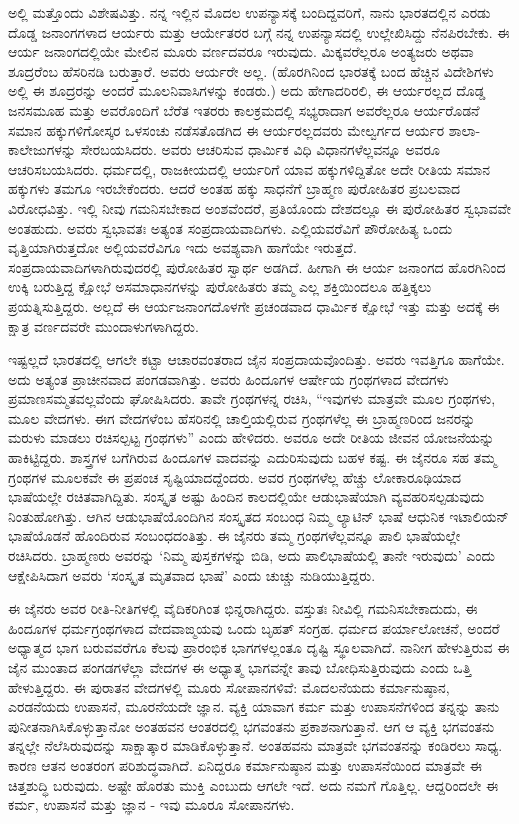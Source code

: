 ಅಲ್ಲಿ ಮತ್ತೊಂದು ವಿಶೇಷವಿತ್ತು. ನನ್ನ ಇಲ್ಲಿನ ಮೊದಲ ಉಪನ್ಯಾಸಕ್ಕೆ ಬಂದಿದ್ದವರಿಗೆ, ನಾನು ಭಾರತದಲ್ಲಿನ ಎರಡು ದೊಡ್ಡ ಜನಾಂಗಗಳಾದ ಆರ್ಯರು ಮತ್ತು ಆರ್ಯೇತರರ ಬಗ್ಗೆ ನನ್ನ ಉಪನ್ಯಾಸದಲ್ಲಿ ಉಲ್ಲೇಖಿಸಿದ್ದು ನೆನಪಿರಬೇಕು. ಈ ಆರ್ಯ ಜನಾಂಗದಲ್ಲಿಯೇ ಮೇಲಿನ ಮೂರು ವರ್ಣದವರೂ ಇರುವುದು. ಮಿಕ್ಕವರೆಲ್ಲರೂ ಅಂತ್ಯಜರು ಅಥವಾ ಶೂದ್ರರೆಂಬ ಹೆಸರಿನಡಿ ಬರುತ್ತಾರೆ. ಅವರು ಆರ್ಯರೇ ಅಲ್ಲ. (ಹೊರಗಿನಿಂದ ಭಾರತಕ್ಕೆ ಬಂದ ಹೆಚ್ಚಿನ ವಿದೇಶಿಗಳು ಅಲ್ಲಿ ಈ ಶೂದ್ರರನ್ನು ಅಂದರೆ ಮೂಲನಿವಾಸಿಗಳನ್ನು ಕಂಡರು.) ಅದು ಹೇಗಾದರಿರಲಿ, ಈ ಆರ್ಯರಲ್ಲದ ದೊಡ್ಡ ಜನಸಮೂಹ ಮತ್ತು ಅವರೊಂದಿಗೆ ಬೆರೆತ ಇತರರು ಕಾಲಕ್ರಮದಲ್ಲಿ ಸಭ್ಯರಾದಾಗ ಅವರೆಲ್ಲರೂ ಆರ್ಯರೊಡನೆ ಸಮಾನ ಹಕ್ಕುಗಳಿಗೋಸ್ಕರ ಒಳಸಂಚು ನಡೆಸತೊಡಗಿದ ಈ ಆರ್ಯರಲ್ಲದವರು ಮೇಲ್ವರ್ಗದ ಆರ್ಯರ ಶಾಲಾ-ಕಾಲೇಜುಗಳನ್ನು ಸೇರಬಯಸಿದರು. ಅವರು ಆಚರಿಸುವ ಧಾರ್ಮಿಕ ವಿಧಿ ವಿಧಾನಗಳೆಲ್ಲವನ್ನೂ ಅವರೂ ಆಚರಿಸಬಯಸಿದರು. ಧರ್ಮದಲ್ಲಿ, ರಾಜಕೀಯದಲ್ಲಿ ಆರ್ಯರಿಗೆ ಯಾವ ಹಕ್ಕುಗಳಿದ್ದಿತೋ ಅದೇ ರೀತಿಯ ಸಮಾನ ಹಕ್ಕುಗಳು ತಮಗೂ ಇರಬೇಕೆಂದರು. ಆದರೆ ಅಂತಹ ಹಕ್ಕು ಸಾಧನೆಗೆ ಬ್ರಾಹ್ಮಣ ಪುರೋಹಿತರ ಪ್ರಬಲವಾದ ವಿರೋಧವಿತ್ತು. ಇಲ್ಲಿ ನೀವು ಗಮನಿಸಬೇಕಾದ ಅಂಶವೆಂದರೆ, ಪ್ರತಿಯೊಂದು ದೇಶದಲ್ಲೂ ಈ ಪುರೋಹಿತರ ಸ್ವಭಾವವೇ ಅಂತಹುದು. ಅವರು ಸ್ವಭಾವತಃ ಅತ್ಯಂತ ಸಂಪ್ರದಾಯವಾದಿಗಳು. ಎಲ್ಲಿಯವರೆವಿಗೆ ಪೌರೋಹಿತ್ಯ ಒಂದು ವೃತ್ತಿಯಾಗಿರುತ್ತದೋ ಅಲ್ಲಿಯವರೆವಿಗೂ ಇದು ಅವಶ್ಯವಾಗಿ ಹಾಗೆಯೇ ಇರುತ್ತದೆ. ಸಂಪ್ರದಾಯವಾದಿಗಳಾಗಿರುವುದರಲ್ಲಿ ಪುರೋಹಿತರ ಸ್ವಾರ್ಥ ಅಡಗಿದೆ. ಹೀಗಾಗಿ ಈ ಆರ್ಯ ಜನಾಂಗದ ಹೊರಗಿನಿಂದ ಉಕ್ಕಿ ಬರುತ್ತಿದ್ದ ಕ್ಷೋಭೆ ಅಸಮಾಧಾನಗಳನ್ನು ಪುರೋಹಿತರು ತಮ್ಮ ಎಲ್ಲ ಶಕ್ತಿಯಿಂದಲೂ ಹತ್ತಿಕ್ಕಲು ಪ್ರಯತ್ನಿಸುತ್ತಿದ್ದರು. ಅಲ್ಲದೆ ಈ ಆರ್ಯಜನಾಂಗದೊಳಗೇ ಪ್ರಚಂಡವಾದ ಧಾರ್ಮಿಕ ಕ್ಷೋಭೆ ಇತ್ತು ಮತ್ತು ಅದಕ್ಕೆ ಈ ಕ್ಷಾತ್ರ ವರ್ಣದವರೇ ಮುಂದಾಳುಗಳಾಗಿದ್ದರು.

ಇಷ್ಟಲ್ಲದೆ ಭಾರತದಲ್ಲಿ ಆಗಲೇ ಕಟ್ಟಾ ಆಚಾರವಂತರಾದ ಜೈನ ಸಂಪ್ರದಾಯವೊಂದಿತ್ತು. ಅವರು ಇವತ್ತಿಗೂ ಹಾಗೆಯೇ. ಅದು ಅತ್ಯಂತ ಪ್ರಾಚೀನವಾದ ಪಂಗಡವಾಗಿತ್ತು. ಅವರು ಹಿಂದೂಗಳ ಆರ್ಷೇಯ ಗ್ರಂಥಗಳಾದ ವೇದಗಳು ಪ್ರಮಾಣಸಮ್ಮತವಲ್ಲವೆಂದು ಘೋಷಿಸಿದರು. ತಾವೇ ಗ್ರಂಥಗಳನ್ನ ರಚಿಸಿ, “ಇವುಗಳು ಮಾತ್ರವೇ ಮೂಲ ಗ್ರಂಥಗಳು, ಮೂಲ ವೇದಗಳು. ಈಗ ವೇದಗಳೆಂಬ ಹೆಸರಿನಲ್ಲಿ ಚಾಲ್ತಿಯಲ್ಲಿರುವ ಗ್ರಂಥಗಳೆಲ್ಲ ಈ ಬ್ರಾಹ್ಮಣರಿಂದ ಜನರನ್ನು ಮರುಳು ಮಾಡಲು ರಚಿಸಲ್ಪಟ್ಟ ಗ್ರಂಥಗಳು” ಎಂದು ಹೇಳಿದರು. ಅವರೂ ಅದೇ ರೀತಿಯ ಜೀವನ ಯೋಜನೆಯನ್ನು ಹಾಕಿಟ್ಟಿದ್ದರು. ಶಾಸ್ತ್ರಗಳ ಬಗೆಗಿರುವ ಹಿಂದೂಗಳ ವಾದವನ್ನು ಎದುರಿಸುವುದು ಬಹಳ ಕಷ್ಟ. ಈ ಜೈನರೂ ಸಹ ತಮ್ಮ ಗ್ರಂಥಗಳ ಮೂಲಕವೇ ಈ ಪ್ರಪಂಚ ಸೃಷ್ಟಿಯಾದದ್ದೆಂದರು. ಅವರ ಗ್ರಂಥಗಳೆಲ್ಲ ಹೆಚ್ಚು ಲೋಕಾರೂಢಿಯಾದ ಭಾಷೆಯಲ್ಲೇ ರಚಿತವಾಗಿದ್ದಿತು. ಸಂಸ್ಕೃತ ಅಷ್ಟು ಹಿಂದಿನ ಕಾಲದಲ್ಲಿಯೇ ಆಡುಭಾಷೆಯಾಗಿ ವ್ಯವಹರಿಸಲ್ಪಡುವುದು ನಿಂತುಹೋಗಿತ್ತು. ಆಗಿನ ಆಡುಭಾಷೆಯೊಂದಿಗಿನ ಸಂಸ್ಕೃತದ ಸಂಬಂಧ ನಿಮ್ಮ ಲ್ಯಾಟಿನ್ ಭಾಷೆ ಆಧುನಿಕ ಇಟಾಲಿಯನ್ ಭಾಷೆಯೊಡನೆ ಹೊಂದಿರುವ ಸಂಬಂಧದಂತಿತ್ತು. ಈ ಜೈನರು ತಮ್ಮ ಗ್ರಂಥಗಳೆಲ್ಲವನ್ನೂ ಪಾಲಿ ಭಾಷೆಯಲ್ಲೇ ರಚಿಸಿದರು. ಬ್ರಾಹ್ಮಣರು ಅವರನ್ನು ‘ನಿಮ್ಮ ಪುಸ್ತಕಗಳನ್ನು ಬಿಡಿ, ಅದು ಪಾಲಿಭಾಷೆಯಲ್ಲಿ ತಾನೇ ಇರುವುದು’ ಎಂದು ಆಕ್ಷೇಪಿಸಿದಾಗ ಅವರು ‘ಸಂಸ್ಕೃತ ಮೃತವಾದ ಭಾಷೆ’ ಎಂದು ಚುಚ್ಚು ನುಡಿಯುತ್ತಿದ್ದರು.

ಈ ಜೈನರು ಅವರ ರೀತಿ-ನೀತಿಗಳಲ್ಲಿ ವೈದಿಕರಿಗಿಂತ ಭಿನ್ನರಾಗಿದ್ದರು. ವಸ್ತುತಃ ನೀವಿಲ್ಲಿ ಗಮನಿಸಬೇಕಾದುದು, ಈ ಹಿಂದೂಗಳ ಧರ್ಮಗ್ರಂಥಗಳಾದ ವೇದವಾಙ್ಮಯವು ಒಂದು ಬೃಹತ್ ಸಂಗ್ರಹ. ಧರ್ಮದ ಪರ್ಯಾಲೋಚನೆ, ಅಂದರೆ ಅಧ್ಯಾತ್ಮದ ಭಾಗ ಬರುವವರೆಗೂ ಕೆಲವು ಪ್ರಾರಂಭಿಕ ಭಾಗಗಳಲ್ಲಂತೂ ದೃಷ್ಟಿ ಸ್ಥೂಲವಾಗಿದೆ. ನಾನೀಗ ಹೇಳುತ್ತಿರುವ ಈ ಜೈನ ಮುಂತಾದ ಪಂಗಡಗಳೆಲ್ಲಾ ವೇದಗಳ ಈ ಅಧ್ಯಾತ್ಮ ಭಾಗವನ್ನೇ ತಾವು ಬೋಧಿಸುತ್ತಿರುವುದು ಎಂದು ಒತ್ತಿ ಹೇಳುತ್ತಿದ್ದರು. ಈ ಪುರಾತನ ವೇದಗಳಲ್ಲಿ ಮೂರು ಸೋಪಾನಗಳಿವೆ: ಮೊದಲನೆಯದು ಕರ್ಮಾನುಷ್ಠಾನ, ಎರಡನೆಯದು ಉಪಾಸನೆ, ಮೂರನೆಯದೇ ಜ್ಞಾನ. ವ್ಯಕ್ತಿ ಯಾವಾಗ ಕರ್ಮ ಮತ್ತು ಉಪಾಸನೆಗಳಿಂದ ತನ್ನನ್ನು ತಾನು ಪುನೀತನಾಗಿಸಿಕೊಳ್ಳುತ್ತಾನೋ ಅಂತಹವನ ಆಂತರದಲ್ಲಿ ಭಗವಂತನು ಪ್ರಕಾಶನಾಗುತ್ತಾನೆ. ಆಗ ಆ ವ್ಯಕ್ತಿ ಭಗವಂತನು ತನ್ನಲ್ಲೇ ನೆಲೆಸಿರುವುದನ್ನು ಸಾಕ್ಷಾತ್ಕಾರ ಮಾಡಿಕೊಳ್ಳುತ್ತಾನೆ. ಅಂತಹವನು ಮಾತ್ರವೇ ಭಗವಂತನನ್ನು ಕಂಡಿರಲು ಸಾಧ್ಯ. ಕಾರಣ ಆತನ ಅಂತರಂಗ ಪರಿಶುದ್ಧವಾಗಿದೆ. ಏನಿದ್ದರೂ ಕರ್ಮಾನುಷ್ಠಾನ ಮತ್ತು ಉಪಾಸನೆಯಿಂದ ಮಾತ್ರವೇ ಈ ಚಿತ್ತಶುದ್ಧಿ ಬರುವುದು. ಅಷ್ಟೇ ಹೊರತು ಮುಕ್ತಿ ಎಂಬುದು ಆಗಲೇ ಇದೆ. ಅದು ನಮಗೆ ಗೊತ್ತಿಲ್ಲ. ಆದ್ದರಿಂದಲೇ ಈ ಕರ್ಮ, ಉಪಾಸನೆ ಮತ್ತು ಜ್ಞಾನ - ಇವು ಮೂರೂ ಸೋಪಾನಗಳು.

